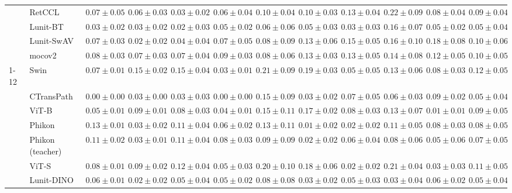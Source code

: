 \begin{tabular}{ll|cccc|c|cccc|c}
 & RetCCL & $0.07 \pm 0.05$ & $0.06 \pm 0.03$ & $0.03 \pm 0.02$ & $0.06 \pm 0.04$ & $0.10 \pm 0.04$ & $0.10 \pm 0.03$ & $0.13 \pm 0.04$ & $0.22 \pm 0.09$ & $0.08 \pm 0.04$ & $0.09 \pm 0.04$ \\
 & Lunit-BT & $0.03 \pm 0.02$ & $0.03 \pm 0.02$ & $0.02 \pm 0.03$ & $0.05 \pm 0.02$ & $0.06 \pm 0.06$ & $0.05 \pm 0.03$ & $\mathbf{0.03 \pm 0.03}$ & $0.16 \pm 0.07$ & $0.05 \pm 0.02$ & $0.05 \pm 0.04$ \\
 & Lunit-SwAV & $0.07 \pm 0.03$ & $0.02 \pm 0.02$ & $0.04 \pm 0.04$ & $0.07 \pm 0.05$ & $0.08 \pm 0.09$ & $0.13 \pm 0.06$ & $0.15 \pm 0.05$ & $0.16 \pm 0.10$ & $0.18 \pm 0.08$ & $0.10 \pm 0.06$ \\
 & mocov2 & $0.08 \pm 0.03$ & $0.07 \pm 0.03$ & $0.07 \pm 0.04$ & $0.09 \pm 0.03$ & $0.08 \pm 0.06$ & $0.13 \pm 0.03$ & $0.13 \pm 0.05$ & $0.14 \pm 0.08$ & $0.12 \pm 0.05$ & $0.10 \pm 0.05$ \\
\cline{1-12}
\multirow[t]{12}{*}{Mean pool} & Swin & $0.07 \pm 0.01$ & $0.15 \pm 0.02$ & $0.15 \pm 0.04$ & $0.03 \pm 0.01$ & $0.21 \pm 0.09$ & $0.19 \pm 0.03$ & $0.05 \pm 0.05$ & $0.13 \pm 0.06$ & $0.08 \pm 0.03$ & $0.12 \pm 0.05$ \\
 & CTransPath & $\mathbf{0.00 \pm 0.00}$ & $0.03 \pm 0.00$ & $0.03 \pm 0.03$ & $\mathbf{0.00 \pm 0.00}$ & $0.15 \pm 0.09$ & $0.03 \pm 0.02$ & $0.07 \pm 0.05$ & $0.06 \pm 0.03$ & $0.09 \pm 0.02$ & $0.05 \pm 0.04$ \\
 & ViT-B & $0.05 \pm 0.01$ & $0.09 \pm 0.01$ & $0.08 \pm 0.03$ & $0.04 \pm 0.01$ & $0.15 \pm 0.11$ & $0.17 \pm 0.02$ & $0.08 \pm 0.03$ & $0.13 \pm 0.07$ & $\mathbf{0.01 \pm 0.01}$ & $0.09 \pm 0.05$ \\
 & Phikon & $0.13 \pm 0.01$ & $0.03 \pm 0.02$ & $0.11 \pm 0.04$ & $0.06 \pm 0.02$ & $0.13 \pm 0.11$ & $\mathbf{0.01 \pm 0.02}$ & $\mathbf{0.02 \pm 0.02}$ & $0.11 \pm 0.05$ & $0.08 \pm 0.03$ & $0.08 \pm 0.05$ \\
 & Phikon (teacher) & $0.11 \pm 0.02$ & $0.03 \pm 0.01$ & $0.11 \pm 0.04$ & $0.08 \pm 0.03$ & $0.09 \pm 0.09$ & $0.02 \pm 0.02$ & $0.06 \pm 0.04$ & $0.08 \pm 0.06$ & $0.05 \pm 0.06$ & $0.07 \pm 0.05$ \\
 & ViT-S & $0.08 \pm 0.01$ & $0.09 \pm 0.02$ & $0.12 \pm 0.04$ & $0.05 \pm 0.03$ & $0.20 \pm 0.10$ & $0.18 \pm 0.06$ & $0.02 \pm 0.02$ & $0.21 \pm 0.04$ & $0.03 \pm 0.03$ & $0.11 \pm 0.05$ \\
 & Lunit-DINO & $0.06 \pm 0.01$ & $0.02 \pm 0.02$ & $0.05 \pm 0.04$ & $0.05 \pm 0.02$ & $\mathbf{0.08 \pm 0.08}$ & $0.03 \pm 0.02$ & $0.05 \pm 0.03$ & $0.03 \pm 0.04$ & $0.06 \pm 0.02$ & $\mathbf{0.05 \pm 0.04}$ \\

\end{tabular}
